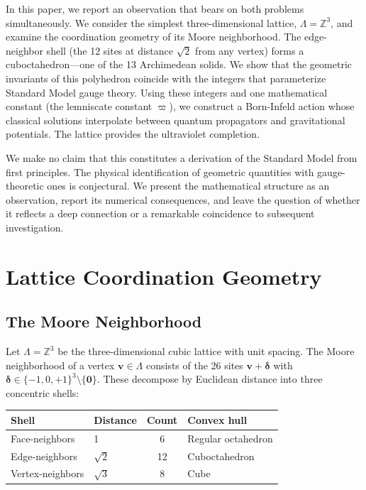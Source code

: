 \documentclass[12pt,a4paper]{article}
\newcommand{\vpi}{\varpi}
\begin{document}
In this paper, we report an observation that bears on both problems simultaneously. We consider the simplest three-dimensional lattice, $\Lambda = \mathbb{Z}^{3}$, and examine the coordination geometry of its Moore neighborhood. The edge-neighbor shell (the 12 sites at distance $\sqrt{2}$ from any vertex) forms a cuboctahedron---one of the 13 Archimedean solids. We show that the geometric invariants of this polyhedron coincide with the integers that parameterize Standard Model gauge theory. Using these integers and one mathematical constant (the lemniscate constant $\vpi$), we construct a Born-Infeld action whose classical solutions interpolate between quantum propagators and gravitational potentials. The lattice provides the ultraviolet completion.

We make no claim that this constitutes a derivation of the Standard Model from first principles. The physical identification of geometric quantities with gauge-theoretic ones is conjectural. We present the mathematical structure as an observation, report its numerical consequences, and leave the question of whether it reflects a deep connection or a remarkable coincidence to subsequent investigation.

\section{Lattice Coordination Geometry}

\subsection{The Moore Neighborhood}

Let $\Lambda = \mathbb{Z}^{3}$ be the three-dimensional cubic lattice with unit spacing. The Moore neighborhood of a vertex $\mathbf{v} \in \Lambda$ consists of the 26 sites $\mathbf{v} + \boldsymbol{\delta}$ with $\boldsymbol{\delta} \in \{-1, 0, +1\}^{3} \setminus \{\mathbf{0}\}$. These decompose by Euclidean distance into three concentric shells:

\begin{table}[H]
\centering
\begin{tabular}{@{}llcl@{}}
\toprule
Shell & Distance & Count & Convex hull \\
\midrule
Face-neighbors & 1 & 6 & Regular octahedron \\
Edge-neighbors & $\sqrt{2}$ & 12 & Cuboctahedron \\
Vertex-neighbors & $\sqrt{3}$ & 8 & Cube \\
\bottomrule
\end{tabular}
\end{table}
\end{document}
